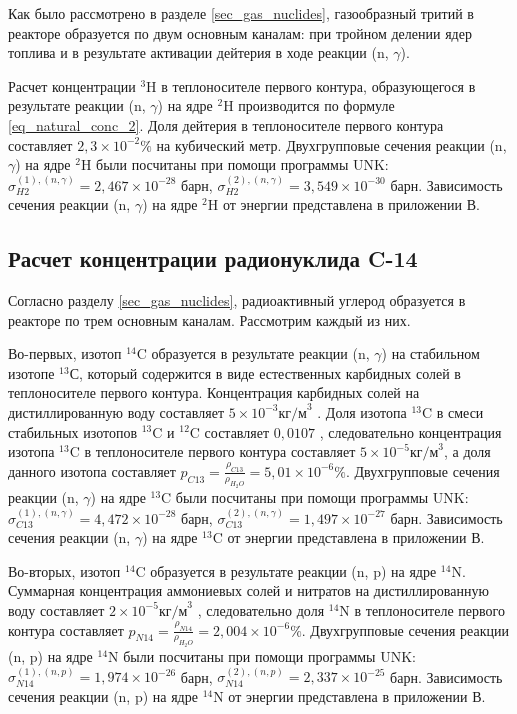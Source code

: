 Как было рассмотрено в разделе \ref{sec_gas_nuclides}, газообразный тритий в реакторе образуется по двум основным 
каналам: при тройном делении ядер топлива и в результате активации дейтерия в ходе реакции (n, $\gamma$). 

Расчет концентрации $^{3}\text{H}$ в теплоносителе первого контура, образующегося в результате реакции (n, $\gamma$) на 
ядре $^{2}\text{H}$ производится по формуле \ref{eq_natural_conc_2}. Доля дейтерия в теплоносителе первого контура 
составляет $2,3 \times 10^{-2} \%$ на кубический метр. Двухгрупповые сечения реакции (n, $\gamma$) на ядре 
$^{2}\text{H}$ были посчитаны при помощи программы UNK: 
$\sigma_{H2}^{(1), (n, \gamma)} = 2,467 \times 10^{-28}$ барн, 
$\sigma_{H2}^{(2), (n, \gamma)} = 3,549 \times 10^{-30}$ барн. 
Зависимость сечения реакции (n, $\gamma$) на ядре $^{2}\text{H}$ от энергии представлена в приложении В.

\subsection{Расчет концентрации радионуклида C-14}

Согласно разделу \ref{sec_gas_nuclides}, радиоактивный углерод образуется в реакторе по трем основным каналам. 
Рассмотрим каждый из них.

Во-первых, изотоп $^{14}\text{C}$ образуется в результате реакции (n, $\gamma$) на стабильном изотопе $^{13}\text{С}$, 
который содержится в виде естественных карбидных солей в теплоносителе первого контура. Концентрация карбидных солей на 
дистиллированную воду составляет $5 \times 10^{-3} \text{кг/м}^{3}$ \cite{gost_water}. Доля изотопа $^{13}\text{C}$ в 
смеси стабильных изотопов $^{13}\text{C}$ и $^{12}\text{C}$ составляет $0,0107$ \cite{audi_carbid_sald}, следовательно 
концентрация изотопа $^{13}\text{C}$ в теплоносителе первого контура составляет $5 \times 10^{-5} \text{кг/м}^{3}$, а 
доля данного изотопа составляет $p_{C13} = \frac{\rho_{C13}}{\rho_{H_{2}O}} = 5,01 \times 10^{-6} \%$. Двухгрупповые 
сечения реакции (n, $\gamma$) на ядре $^{13}\text{C}$ были посчитаны при помощи программы UNK:
$\sigma_{C13}^{(1), (n, \gamma)} = 4,472 \times 10^{-28}$ барн, 
$\sigma_{C13}^{(2), (n, \gamma)} = 1,497 \times 10^{-27}$ барн.
Зависимость сечения реакции (n, $\gamma$) на ядре $^{13}\text{C}$ от энергии представлена в приложении В.

Во-вторых, изотоп $^{14}\text{C}$ образуется в результате реакции (n, p) на ядре $^{14}\text{N}$. Суммарная концентрация 
аммониевых солей и нитратов на дистиллированную воду составляет $2 \times 10^{-5} \text{кг/м}^{3}$ \cite{gost_water}, 
следовательно доля $^{14}\text{N}$ в теплоносителе первого контура составляет 
$p_{N14} = \frac{\rho_{N14}}{\rho_{H_{2}O}} = 2,004 \times 10^{-6} \%$. Двухгрупповые сечения реакции (n, p) на ядре 
$^{14}\text{N}$ были посчитаны при помощи программы UNK:
$\sigma_{N14}^{(1), (n, p)} = 1,974 \times 10^{-26}$ барн, 
$\sigma_{N14}^{(2), (n, p)} = 2,337 \times 10^{-25}$ барн.
Зависимость сечения реакции (n, p) на ядре $^{14}\text{N}$ от энергии представлена в приложении В.

